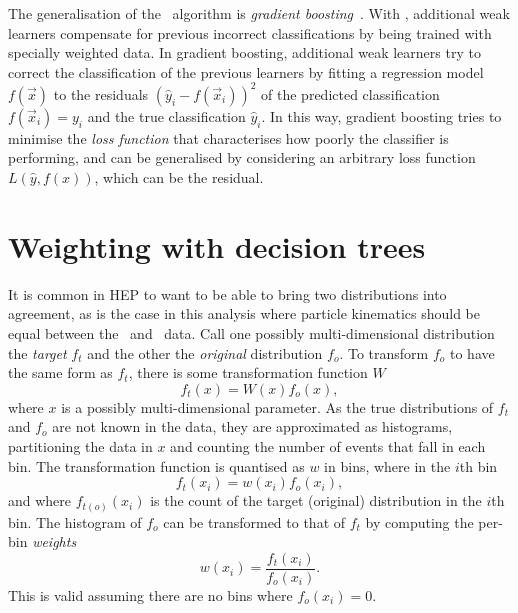 The generalisation of the \adaboost\ algorithm is \emph{gradient 
  boosting}~\cite{friedman2001}.
With \adaboost, additional weak learners compensate for previous incorrect 
classifications by being trained with specially weighted data.
In gradient boosting, additional weak learners try to correct the 
classification of the previous learners by fitting a regression model 
$f(\vec{x})$ to the residuals ${(\hat{y}_{i} - f(\vec{x}_{i}))}^2$ of the 
predicted classification $f(\vec{x}_{i}) = y_{i}$ and the true classification 
$\hat{y}_{i}$.
In this way, gradient boosting tries to minimise the \emph{loss function} that 
characterises how poorly the classifier is performing, and can be generalised 
by considering an arbitrary loss function $L(\hat{y}, f(x))$, which can be the 
residual.

\section{Weighting with decision trees}
\label{chap:cpv:kinematic_weighting:bdt_method}

It is common in \acl{HEP} to want to be able to bring two distributions into 
agreement, as is the case in this analysis where particle kinematics should be 
equal between the \pKK\ and \ppipi\ data.
Call one possibly multi-dimensional distribution the \emph{target} $f_{t}$ and 
the other the \emph{original} distribution $f_{o}$.
To transform $f_{o}$ to have the same form as $f_{t}$, there is some 
transformation function $W$
\begin{equation}
  f_{t}(x) = W(x)f_{o}(x),
\end{equation}
where $x$ is a possibly multi-dimensional parameter.
As the true distributions of $f_{t}$ and $f_{o}$ are not known in the data, 
they are approximated as histograms, partitioning the data in $x$ and counting 
the number of events that fall in each bin.
The transformation function is quantised as $w$ in bins, where in the $i$th bin
\begin{equation}
  f_{t}(x_{i}) = w(x_{i})f_{o}(x_{i}),
\end{equation}
and where $f_{t(o)}(x_{i})$ is the count of the target (original) distribution 
in the $i$th bin.
The histogram of $f_{o}$ can be transformed to that of $f_{t}$ by computing the 
per-bin \emph{weights}
\begin{equation}
  w(x_{i}) = \frac{f_{t}(x_{i})}{f_{o}(x_{i})}.
\end{equation}
This is valid assuming there are no bins where $f_{o}(x_{i}) = 0$.

